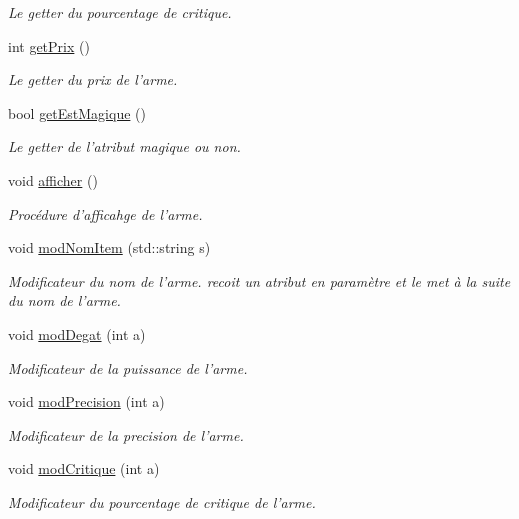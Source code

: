\begin{DoxyCompactItemize}
\begin{DoxyCompactList}\small\item\em Le getter du pourcentage de critique. \end{DoxyCompactList}\item 
\hypertarget{classArme_a8a869ed0c784eb1c3a1bf3cce5795cc4}{int \hyperlink{classArme_a8a869ed0c784eb1c3a1bf3cce5795cc4}{get\-Prix} ()}\label{classArme_a8a869ed0c784eb1c3a1bf3cce5795cc4}

\begin{DoxyCompactList}\small\item\em Le getter du prix de l'arme. \end{DoxyCompactList}\item 
\hypertarget{classArme_a0a33412d430f095cd0f1670f8e578286}{bool \hyperlink{classArme_a0a33412d430f095cd0f1670f8e578286}{get\-Est\-Magique} ()}\label{classArme_a0a33412d430f095cd0f1670f8e578286}

\begin{DoxyCompactList}\small\item\em Le getter de l'atribut magique ou non. \end{DoxyCompactList}\item 
\hypertarget{classArme_a16daef8f9c593be587010a6daf2b8c88}{void \hyperlink{classArme_a16daef8f9c593be587010a6daf2b8c88}{afficher} ()}\label{classArme_a16daef8f9c593be587010a6daf2b8c88}

\begin{DoxyCompactList}\small\item\em Procédure d'afficahge de l'arme. \end{DoxyCompactList}\item 
void \hyperlink{classArme_ad6704d25feb838154e846c223e041654}{mod\-Nom\-Item} (std\-::string s)
\begin{DoxyCompactList}\small\item\em Modificateur du nom de l'arme. recoit un atribut en paramètre et le met à la suite du nom de l'arme. \end{DoxyCompactList}\item 
void \hyperlink{classArme_aed6c105d30b9ca273035933df2149877}{mod\-Degat} (int a)
\begin{DoxyCompactList}\small\item\em Modificateur de la puissance de l'arme. \end{DoxyCompactList}\item 
void \hyperlink{classArme_a1421ea487a74a824825a93ff15fcbc9d}{mod\-Precision} (int a)
\begin{DoxyCompactList}\small\item\em Modificateur de la precision de l'arme. \end{DoxyCompactList}\item 
void \hyperlink{classArme_a19aa993baf29e53d68e9c55a69025647}{mod\-Critique} (int a)
\begin{DoxyCompactList}\small\item\em Modificateur du pourcentage de critique de l'arme. \end{DoxyCompactList}\end{DoxyCompactItemize}
